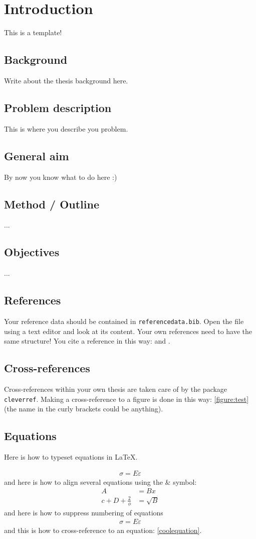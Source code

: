 \chapter{Introduction}
This is a template! 


\section{Background}
Write about the thesis background here.
\section{Problem description}
This is where you describe you problem.
\section{General aim}
By now you know what to do here :)
\section{Method / Outline }
...

\section{Objectives}
...

\section{References}
Your reference data should be contained in \texttt{referencedata.bib}. Open the file using a text editor and look at its content. Your own references need to have the same structure! You cite a reference in this way: \textcite{Harryson2014} and \textcite{Noren2006}.

\section{Cross-references}
Cross-references within your own thesis are taken care of by the package \texttt{cleverref}. Making a cross-reference to a figure is done in this way: \cref{figure:test} (the name in the curly brackets could be anything).

\section{Equations}
Here is how to typeset equations in \LaTeX{}.

\begin{align}
\sigma = E\varepsilon \label{coolequation}
\end{align}
and here is how to align several equations using the \& symbol:
\begin{align}
A &= Bx \\ %
c + D +\frac{2}{\phi} &= \sqrt{B}
\end{align}
and here is how to suppress numbering of equations
\begin{align*}
\sigma = E\varepsilon
\end{align*}
and this is how to cross-reference to an equation: \cref{coolequation}.

